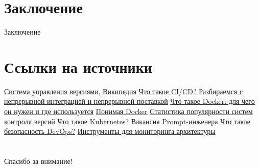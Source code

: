 \documentclass [8pt] {beamer}
\begin{document}
\section{Заключение}

\begin{frame}
\Huge
\centering
Заключение
\end{frame}


\section{Ссылки на источники}
\large
\begin{frame}
\begin{thebibliography}{00}
\bibitem{} \href{URL: https://ru.wikipedia.org/wiki/Система_управления_версиями}{Система управления версиями, Википедия}
\bibitem{} \href{URL: https://habr.com/ru/companies/otus/articles/515078/}{Что такое CI/CD? Разбираемся с непрерывной интеграцией и непрерывной поставкой}
\bibitem{} \href{URL: https://selectel.ru/blog/what-is-docker}{Что такое Docker: для чего он нужен и где используется}
\bibitem{} \href{URL: https://habr.com/ru/articles/253877/}{Понимая Docker}
\bibitem{} \href{URL: https://strawpoll.com/most-popular-version-control-system}{Статистика популярности систем контроля версий}
\bibitem{} \href{https://kubernetes.io/ru/docs/concepts/overview/what-is-kubernetes/}{Что такое Kubernetes?}
\bibitem{} \href{URL: https://uk.indeed.com/viewjob?jk=7bd6b6bd58342cad&from=serp&vjs=3}{Вакансия Prompt-инженера}
\bibitem{} \href{URL: https://www.keepersecurity.com/ru_RU/resources/glossary/what-is-devops-security/}{Что такое безопасность DevOps?}
\bibitem{} \href{URL: https://proglib.io/p/12-instrumentov-devops-inzhenera-dlya-monitoringa-arhitektury-2020-02-13}{Инструменты для мониторинга архитектуры}

\end{thebibliography}
\end{frame}

\section{}

\Huge
\begin{frame}
\centering
Спасибо за внимание!
\end{frame}
\end{document}
